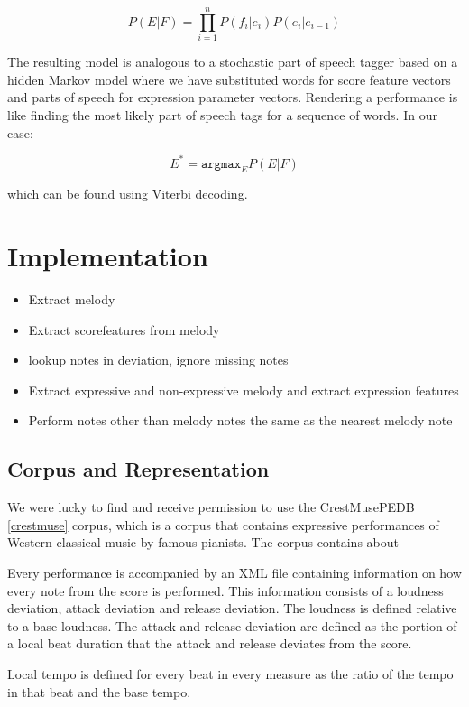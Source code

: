\documentclass[a4paper,10pt]{article}
\begin{document}
\begin{equation}
P(E|F) = \displaystyle\prod_{i=1}^{n}P(f_i|e_i)P(e_i|e_{i-1})
\end{equation}

The resulting model is analogous to a stochastic part of speech tagger based on a hidden Markov model where we have substituted words for score feature vectors and parts of speech for expression parameter vectors. Rendering a performance is like finding the most likely part of speech tags for a sequence of words. In our case:

\[E^* = \texttt{argmax}_E P(E|F)\]

which can be found using Viterbi decoding.

\section{Implementation}


\begin{itemize}
\item Extract melody
\item Extract scorefeatures from melody
\item lookup notes in deviation, ignore missing notes
\item Extract expressive and non-expressive melody and extract expression features
\item Perform notes other than melody notes the same as the nearest melody note
\end{itemize}
\subsection{Corpus and Representation}
We were lucky to find and receive permission to use the CrestMusePEDB \ref{crestmuse} corpus, which is a corpus that contains expressive performances of Western classical music by famous pianists. The corpus contains about 

Every performance is accompanied by an XML file containing information on how every note from the score is performed. This information consists of a loudness deviation, attack deviation and release deviation. The loudness is defined relative to a base loudness. The attack and release deviation are defined as the portion of a local beat duration that the attack and release deviates from the score. 

Local tempo is defined for every beat in every measure as the ratio of the tempo in that beat and the base tempo. 
\end{document}
